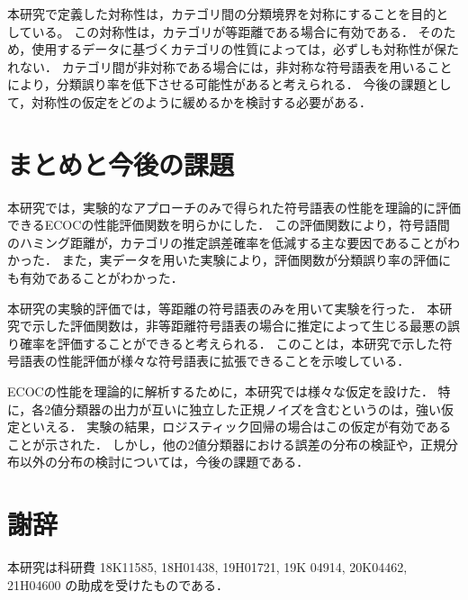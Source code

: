 \documentclass{jarticle}
\theoremstyle{definition}
\begin{document}
本研究で定義した対称性は，カテゴリ間の分類境界を対称にすることを目的としている。
この対称性は，カテゴリが等距離である場合に有効である．
そのため，使用するデータに基づくカテゴリの性質によっては，必ずしも対称性が保たれない．
カテゴリ間が非対称である場合には，非対称な符号語表を用いることにより，分類誤り率を低下させる可能性があると考えられる．
今後の課題として，対称性の仮定をどのように緩めるかを検討する必要がある．

\section{まとめと今後の課題}
本研究では，実験的なアプローチのみで得られた符号語表の性能を理論的に評価できるECOCの性能評価関数を明らかにした．
この評価関数により，符号語間のハミング距離が，カテゴリの推定誤差確率を低減する主な要因であることがわかった．
また，実データを用いた実験により，評価関数が分類誤り率の評価にも有効であることがわかった．

本研究の実験的評価では，等距離の符号語表のみを用いて実験を行った．
本研究で示した評価関数は，非等距離符号語表の場合に推定によって生じる最悪の誤り確率を評価することができると考えられる．
このことは，本研究で示した符号語表の性能評価が様々な符号語表に拡張できることを示唆している．

ECOCの性能を理論的に解析するために，本研究では様々な仮定を設けた．
特に，各2値分類器の出力が互いに独立した正規ノイズを含むというのは，強い仮定といえる．
実験の結果，ロジスティック回帰の場合はこの仮定が有効であることが示された．
しかし，他の2値分類器における誤差の分布の検証や，正規分布以外の分布の検討については，今後の課題である．
\section*{謝辞}
本研究は科研費 18K11585, 18H01438, 19H01721, 19K 04914, 20K04462, 21H04600 の助成を受けたものである．


\end{document}
